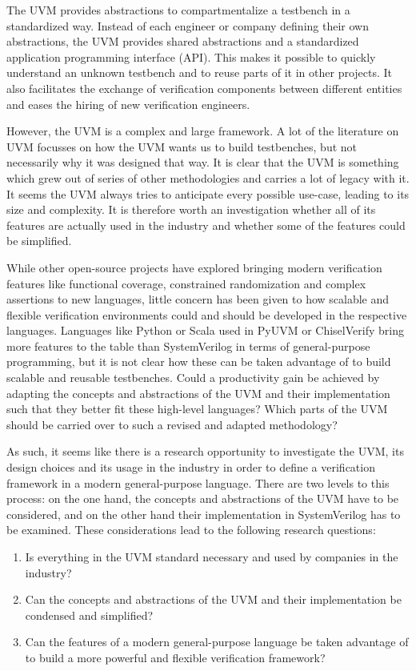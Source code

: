\documentclass[11pt]{report}
\begin{document}
The UVM provides abstractions to compartmentalize a testbench in a standardized way. Instead of each engineer or
company defining their own abstractions, the UVM provides shared abstractions and a standardized application
programming interface (API). This makes it possible to quickly
understand an unknown testbench and to reuse parts of it in other projects. It also facilitates the exchange of
verification components between different entities and eases the hiring of new verification engineers.

However, the UVM is a complex and large framework. A lot of the literature on UVM focusses on how the UVM wants us to
build testbenches, but not necessarily why it was designed that way. It is clear that the UVM is something which grew
out of series of other methodologies and carries a lot of legacy with it. It seems the UVM always tries to anticipate
every possible use-case, leading to its size and complexity. It is therefore worth an investigation whether all of
its features are actually used in the industry and whether some of the features could be simplified.

While other open-source projects have explored bringing modern verification features like functional coverage,
constrained randomization and complex assertions to new languages, little concern has been given to how scalable and
flexible verification environments could and should be developed in the respective languages. Languages like Python
or Scala used in PyUVM or ChiselVerify bring more features to the table than SystemVerilog in terms of
general-purpose programming, but it is not clear how these can be taken advantage of to build scalable and reusable
testbenches. Could a productivity gain be achieved by adapting the concepts and abstractions of the UVM and their
implementation such that they better fit these high-level languages? Which parts of the UVM should be carried over to
such a revised and adapted methodology?

As such, it seems like there is a research opportunity to investigate the UVM, its design choices and its usage in
the industry in order to define a verification framework in a modern general-purpose language. There are two levels
to this process: on the one hand, the concepts and abstractions of the UVM have to be considered, and on the other
hand their implementation in SystemVerilog has to be examined. These considerations lead to the following research questions:

\begin{enumerate}
  \item Is everything in the UVM standard necessary and used by companies in the industry?
  \item Can the concepts and abstractions of the UVM and their implementation be condensed and simplified?
  \item Can the features of a modern general-purpose language be taken advantage of to build a more powerful and
    flexible verification framework?
\end{enumerate}
\end{document}
